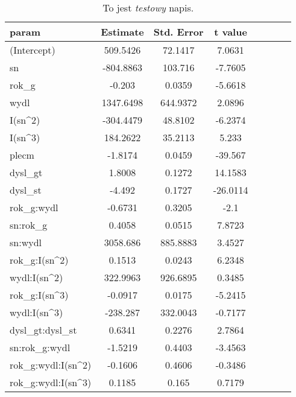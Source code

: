 







 
\begin{table}[tb] 
\begin{tabularx}{\textwidth}{@{\hspace{1.7 mm}}Xccccccc@{\hspace{1.7 mm}}} 
\midrule 
   param & Estimate & Std. Error & t value \\ \bottomrule 
   (Intercept) & 509.5426 & 72.1417 & 7.0631 \\ 
   sn & -804.8863 & 103.716 & -7.7605 \\ 
   rok\_g & -0.203 & 0.0359 & -5.6618 \\ 
   wydl & 1347.6498 & 644.9372 & 2.0896 \\ 
   I(sn\^{ }2) & -304.4479 & 48.8102 & -6.2374 \\ 
   I(sn\^{ }3) & 184.2622 & 35.2113 & 5.233 \\ 
   plecm & -1.8174 & 0.0459 & -39.567 \\ 
   dysl\_gt & 1.8008 & 0.1272 & 14.1583 \\ 
   dysl\_st & -4.492 & 0.1727 & -26.0114 \\ 
   rok\_g:wydl & -0.6731 & 0.3205 & -2.1 \\ 
   sn:rok\_g & 0.4058 & 0.0515 & 7.8723 \\ 
   sn:wydl & 3058.686 & 885.8883 & 3.4527 \\ 
   rok\_g:I(sn\^{ }2) & 0.1513 & 0.0243 & 6.2348 \\ 
   wydl:I(sn\^{ }2) & 322.9963 & 926.6895 & 0.3485 \\ 
   rok\_g:I(sn\^{ }3) & -0.0917 & 0.0175 & -5.2415 \\ 
   wydl:I(sn\^{ }3) & -238.287 & 332.0043 & -0.7177 \\ 
   dysl\_gt:dysl\_st & 0.6341 & 0.2276 & 2.7864 \\ 
   sn:rok\_g:wydl & -1.5219 & 0.4403 & -3.4563 \\ 
   rok\_g:wydl:I(sn\^{ }2) & -0.1606 & 0.4606 & -0.3486 \\ 
   rok\_g:wydl:I(sn\^{ }3) & 0.1185 & 0.165 & 0.7179 \\ 
\end{tabularx} 
\caption*{ To jest \emph{testowy} napis. } 
\end{table} 
 
